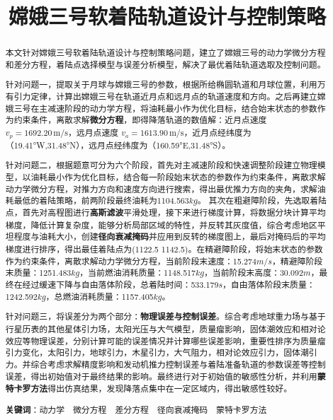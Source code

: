 \documentclass{ctexart}
\title{嫦娥三号软着陆轨道设计与控制策略}
\date{}
\author{}
\begin{document}
\maketitle
\renewcommand{\abstractname}{\Large\textbf{摘要}\\} %
\vspace{-4em} %
\begin{abstract}
\normalsize
本文针对嫦娥三号软着陆轨道设计与控制策略问题，建立了嫦娥三号的动力学微分方程和差分方程，着陆点选择模型与误差分析模型，解决了最优着陆轨道选取及控制问题。

针对问题一，提取关于月球与嫦娥三号的参数，根据所给椭圆轨道和月球位置，利用万有引力定律，计算出嫦娥三号在轨道近月点和远月点的轨道速度和方向。之后再建立嫦娥三号在主减速阶段的动力学方程，将油耗最小作为优化目标，结合始末状态的参数作为约束条件，离散求解\textbf{微分方程}，即得降落轨道的数值解：近月点速度$v_p = 1692.20 \, \text{m/s}$，远月点速度
$v_a = 1613.90 \, \text{m/s}$，近月点经纬度为（19.41°W,31.48°N），远月点经纬度为（160.59°E,31.48°S）。

针对问题二，根据题意可分为六个阶段，首先对主减速阶段和快速调整阶段建立物理模型，以油耗最小作为优化目标，结合每一阶段始末状态的参数作为约束条件，离散求解动力学微分方程，对推力方向和速度方向进行搜索，得出最优推力方向的夹角，求解油耗最低的着陆策略，前两阶段最终油耗为1104.563\(kg\)。
其次在粗避障阶段，先选取着陆点，首先对高程图进行\textbf{高斯滤波}平滑处理，接下来进行梯度计算，将数据分块计算平均梯度，降低计算复杂度，能够分析局部区域的特性，并反转其灰度值，综合考虑地区平坦程度与油耗大小，创建\textbf{径向衰减掩码}并应用到反转的梯度图上，最后对掩码后的平均梯度进行排序，得出最佳着陆点为(1122.5 1142.5)。在精避障阶段，将始末状态的参数作为约束条件，离散求解动力学微分方程，当前阶段末速度：15.274\(m/s\)，精避障阶段末质量：1251.483\(kg\)，当前燃油消耗质量：1148.517\(kg\)，当前阶段末高度：30.092\(m\)，最终在经过缓速下降与自由落体阶段，总着陆时间：533.179\(s\)，自由落体阶段末质量：1242.592\(kg\)，总燃油消耗质量：1157.405\(kg\)。

针对问题三，将误差分为两个部分：\textbf{物理误差与控制误差}。综合考虑地球重力场与基于行星历表的其他星体引力场，太阳光压与大气模型，质量瘤影响，固体潮效应和相对论效应等物理误差，分别计算可能的误差情况并计算哪些误差影响，重要性排序为质量瘤引力变化，太阳引力，地球引力，木星引力，大气阻力，相对论效应引力，固体潮引力。并综合考虑求解精度影响和发动机推力控制误差与着陆准备轨道的参数误差等控制误差，得出初始值对于最终结果的影响。最终进行对于初始值的敏感性分析，并利用\textbf{蒙特卡罗方法}得出仿真结果，发现降落点集中在一定区域内，得出敏感性较好。

\textbf{关键词}：动力学\  \ 微分方程\  \ 差分方程\  \ 径向衰减掩码\  \ 蒙特卡罗方法
\end{abstract}
\newpage
\end{document}
